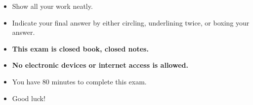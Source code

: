 \documentclass[11pt, addpoints]{exam}
\begin{document}
\vspace{2in}
\begin{itemize}
\item Show all your work neatly.
\item Indicate your final answer by either circling, underlining twice, or boxing your answer.
\item \textbf{This exam is closed book, closed notes.}
\item \textbf{No electronic devices or internet access is allowed.}
\item You have 80 minutes to complete this exam.
\item Good luck!
\end{itemize}

           

\clearpage
\end{document}
